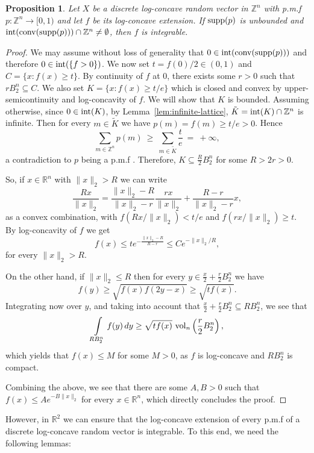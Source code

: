 \documentclass[11pt,a4paper]{article} %
\newtheorem{proposition}[theorem]{Proposition}
\theoremstyle{definition}
\theoremstyle{remark}
\newcommand{\conv}{\mathrm{conv}}
\newcommand{\1}{\mathds{1}}
\newcommand{\vol}{{\rm{vol}}}
\begin{document}
\begin{proposition}\label{prop:unbounded}
    Let $X$ be a discrete log-concave random vector in $\mathbb{Z}^n$ with p.m.f $p:\mathbb{Z}^n \to [0,1) $ and let $f$ be its log-concave extension. If ${\rm supp}(p)$ is unbounded and ${\rm int}(\conv({\rm supp}(p))) \cap \mathbb{Z}^n \neq \emptyset$, then $f$ is integrable.
\end{proposition}

\begin{proof}
    We may assume without loss of generality that $0 \in {\rm int}(\conv({\rm supp}(p)))$ and therefore $0 \in {\rm int}(\{f>0\})$. We now set $t=f(0)/2 \in (0,1)$ and $C=\{x:f(x)\geq t\}$. By continuity of $f$ at $0$, there exists some $r>0$ such that $rB_2^n \subseteq C$. We also set $K=\{x:f(x) \geq t/e \}$ which is closed and convex by upper-semicontinuity and log-concavity of $f$. We will show that $K$ is bounded. Assuming otherwise, since $0 \in {\rm int}(K)$, by Lemma~\ref{lem:infinite-lattice},  $\tilde{K}={\rm int}(K) \cap \mathbb{Z}^n$ is infinite. Then for 
every $m\in \tilde{K}$ we have $p(m)=f(m)\ge t/e>0$. Hence
\[
\sum_{m\in\mathbb{Z}^n}p(m)\ \ge\ \sum_{m\in \tilde{K}}\frac{t}{e}\ =\ +\infty,
\]
a contradiction to $p$ being a p.m.f .
Therefore, $K \subseteq \frac{R}{2}B_2^n$ for some $R>2r>0$.

     So, if $x \in \mathbb{R}^n$ with $\|x\|_2>R$ we can write $$\frac{Rx}{\|x\|_2}=\frac{\|x\|_2-R}{\|x\|_2-r}\frac{rx}{\|x\|_2}+\frac{R-r}{\|x\|_2-r}x,$$ as a convex combination, with $f(Rx/\|x\|_2) < t/e$ and $f(rx/\|x\|_2) \geq t$. By log-concavity of $f$ we get $$f(x) \leq t e^{- \frac{\|x\|_2-R}{R-r}} \leq C e^{-\|x\|_2 / R},$$ for every $\|x\|_2 > R$.

    On the other hand, if $\|x\|_2\leq R$ then for every $y \in \frac{x}{2}+\frac{r}{2}B_2^n$ we have $$f(y) \geq \sqrt{f(x)f(2y-x) } \geq \sqrt{tf(x)}.$$ Integrating now over $y$, and taking into account that $\frac{x}{2}+\frac{r}{2}B_2^n \subseteq RB_2^n$, we see that $$\int\limits_{RB_2^n} f(y) \, dy \geq \sqrt{tf(x)} \  \vol_n\left(\frac{r}{2}B_2^n\right),$$ which yields that $f(x) \leq M$ for some $M>0$, as $f$ is log-concave and $RB_2^n$ is compact.

    Combining the above, we see that there are some $A,B>0$ such that $f(x) \leq Ae^{-B\|x\|_2}$ for every $x \in \mathbb{R}^n$, which directly concludes the proof.
\end{proof}

However, in $\mathbb{R}^2$ we can ensure that the log-concave extension of every  p.m.f of a discrete log-concave random vector is integrable. To this end, we need the following lemmas:
\end{document}
